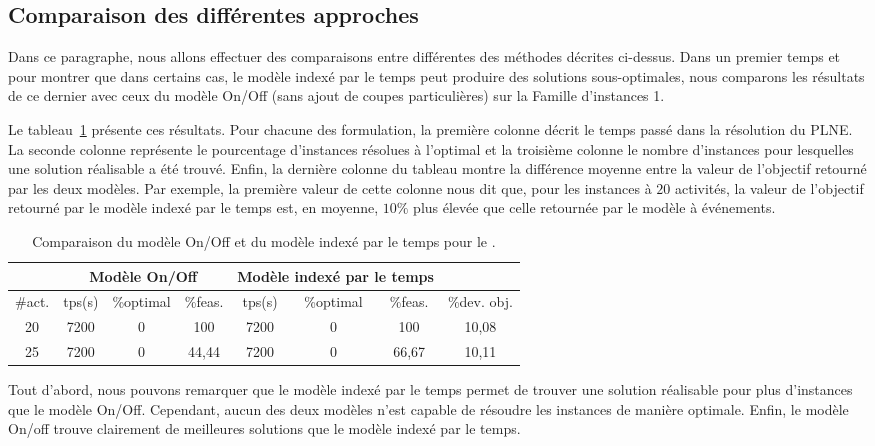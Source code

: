 \subsection{Comparaison des différentes approches}

Dans ce paragraphe, nous allons effectuer des comparaisons entre
différentes des méthodes décrites ci-dessus. Dans un premier temps et
pour montrer que dans certains cas, le modèle indexé par le temps peut
produire des solutions sous-optimales, nous comparons les résultats de
ce dernier avec ceux du modèle On/Off (sans ajout de coupes
particulières) sur la Famille d'instances 1.   

Le tableau~\ref{CECSPMIPOBJ} présente ces résultats. Pour chacune des
formulation, la première colonne décrit le temps passé dans la
résolution du PLNE. La seconde colonne représente le pourcentage
d'instances résolues à l'optimal et la troisième colonne le nombre
d'instances pour lesquelles une solution réalisable a été
trouvé. Enfin, la dernière colonne du tableau montre la différence
moyenne entre la valeur de l'objectif retourné par les deux
modèles. Par exemple, la première valeur de cette colonne nous dit
que, pour les instances à $20$ activités, la valeur de l'objectif
retourné par le modèle indexé par le temps est, en moyenne, $10\%$
plus élevée que celle retournée par le modèle à événements. 

\begin{table}[ht] \centering
  \begin{tabular}{|c|ccc|ccc|c|}
    \hline
    & \multicolumn{3}{c|}{Modèle On/Off} &  \multicolumn{3}{c|}{Modèle
                                           indexé par le temps} &\\
    \hline
    \#act.&tps(s)&\%optimal&\%feas.&tps(s)&\%optimal
                              &\%feas.&\%dev. obj. \\
    \hline
    20 &7200 &0 &100 &7200 &0 &100 & 10,08\\
    25 &7200 &0 &44,44 &7200 &0 &66,67 & 10,11\\
    \hline
  \end{tabular}
  \caption{Comparaison du modèle On/Off et du modèle indexé par le
    temps pour le \CECSP.}
  \label{CECSPMIPOBJ}
\end{table}

Tout d'abord, nous pouvons remarquer que le modèle indexé par le temps
permet de trouver une solution réalisable pour plus d'instances que le
modèle On/Off. Cependant, aucun des deux modèles n'est capable de
résoudre les instances de manière optimale. Enfin, le modèle On/off
trouve clairement de meilleures solutions que le modèle indexé par le
temps. 

